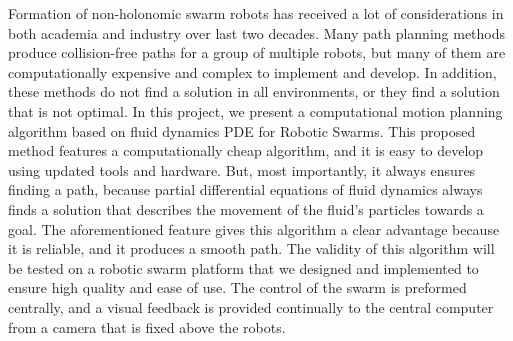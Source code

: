 Formation of non-holonomic swarm robots has received a lot of considerations in both academia and industry over last two decades. Many path planning methods produce collision-free paths for a group of multiple robots, but many of them are computationally expensive and complex to implement and develop. In addition, these methods do not find a solution in all environments, or they find a solution that is not optimal. In this project, we present a computational motion planning algorithm based on fluid dynamics PDE for Robotic Swarms.
This proposed method features a computationally cheap algorithm, and it is easy to develop using updated tools and hardware. But, most importantly, it always ensures finding a path, because partial differential equations of fluid dynamics always finds a solution that describes the movement of the fluid’s particles towards a goal. The aforementioned feature gives this algorithm a clear advantage because it is reliable, and it produces a smooth path.
The validity of this algorithm will be tested on a robotic swarm platform that we designed and implemented to ensure high quality and ease of use. The control of the swarm is preformed centrally, and a visual feedback is provided continually to the central computer from a camera that is fixed above the robots.  
